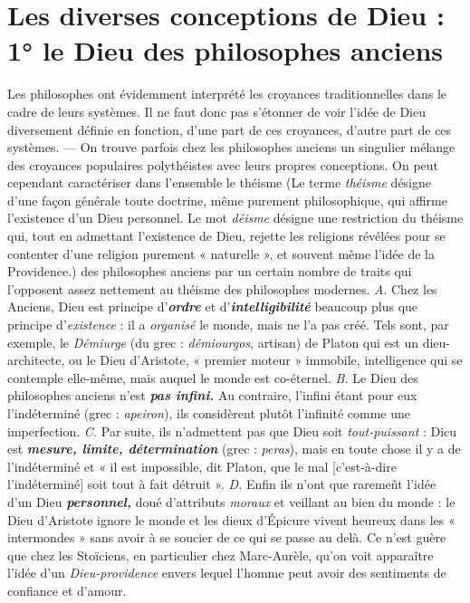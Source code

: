 \section{Les diverses conceptions de Dieu : 1° le Dieu des philosophes
anciens}%
Les philosophes ont évidemment interprété les
croyances traditionnelles dans le cadre de leurs systèmes. Il ne faut
donc pas s’étonner de voir l’idée de Dieu diversement définie en
fonction, d’une part de ces croyances, d'autre part de ces systèmes. —
On trouve parfois chez les philosophes anciens un singulier mélange
des croyances populaires polythéistes avec leurs propres conceptions.
On peut cependant caractériser dans l’ensemble le théisme
{\scriptsize (Le terme {\it théisme} désigne d'une façon générale toute doctrine, même purement
philosophique, qui affirme l'existence d'un Dieu personnel. Le mot {\it déisme} désigne une
restriction du théisme qui, tout en admettant l'existence de Dieu, rejette les religions
révélées pour se contenter d’une religion purement « naturelle », et souvent même l'idée
de la Providence.)}
des philosophes
anciens par un certain nombre de traits qui l’opposent assez
nettement au théisme des philosophes modernes. {\it A}. Chez les Anciens,
Dieu est principe d’\textbf{\textit {ordre}} et d’\textbf{\textit {intelligibilité}} beaucoup plus que
principe d'{\it existence} : il a {\it organisé} le monde, mais {\it }ne l’a pas créé. Tels
sont, par exemple, le {\it Démiurge} (du grec : {\it démiourgos}, artisan) de
Platon qui est un dieu-architecte, ou le Dieu d’Aristote, « premier
moteur » immobile, intelligence qui se contemple elle-même, mais
auquel le monde est co-éternel. {\it B.} Le Dieu des philosophes anciens
n’est \textbf{\textit {pas infini.}} Au contraire, l'infini étant pour eux l’indéterminé
(grec : {\it apeiron}), ils considèrent plutôt l’infinité comme une imperfection.
{\it C.} Par suite, ils n’admettent pas que Dieu soit {\it tout-puissant} :
Dicu est \textbf{\textit {mesure, limite, détermination}} (grec : {\it peras}), mais en toute
chose il y a de l’indéterminé et « il est impossible, dit Platon, que le
mal [c’est-à-dire l’indéterminé] soit tout à fait détruit ». {\it D.} Enfin
ils n’ont que raremeñt l’idée d’un Dieu \textbf{\textit {personnel,}} doué d’attributs
{\it moraux} et veillant au bien du monde : le Dieu d’Aristote ignore le
monde et les dieux d’Épicure vivent heureux dans les « intermondes »
sans avoir à se soucier de ce qui se passe au delà. Ce n’est guère que
chez les Stoïciens, en particulier chez Marc-Aurèle, qu’on voit apparaître
l’idée d’un {\it Dieu-providence} envers lequel l’homme peut avoir
des sentiments de confiance et d’amour.

